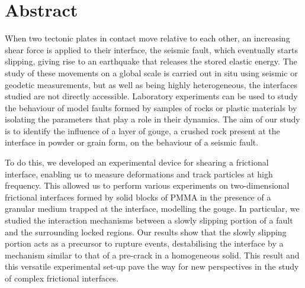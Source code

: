 { \let\cleardoublepage\relax
\chapter*{Abstract}}
\thispagestyle{empty}

When two tectonic plates in contact move relative to each other, an increasing shear force is applied to their interface, the seismic fault, which eventually starts slipping, giving rise to an earthquake that releases the stored elastic energy. The study of these movements on a global scale is carried out in situ using seismic or geodetic measurements, but as well as being highly heterogeneous, the interfaces studied are not directly accessible. Laboratory experiments can be used to study the behaviour of model faults formed by samples of rocks or plastic materials by isolating the parameters that play a role in their dynamics. The aim of our study is to identify the influence of a layer of gouge, a crushed rock present at the interface in powder or grain form, on the behaviour of a seismic fault.


To do this, we developed an experimental device for shearing a frictional interface, enabling us to measure deformations and track particles at high frequency. This allowed us to perform various experiments on two-dimensional frictional interfaces formed by solid blocks of PMMA in the presence of a granular medium trapped at the interface, modelling the gouge. In particular, we studied the interaction mechanisms between a slowly slipping portion of a fault and the surrounding locked regions. Our results show that the slowly slipping portion acts as a precursor to rupture events, destabilising the interface by a mechanism similar to that of a pre-crack in a homogeneous solid. This result and this versatile experimental set-up pave the way for new perspectives in the study of complex frictional interfaces.


